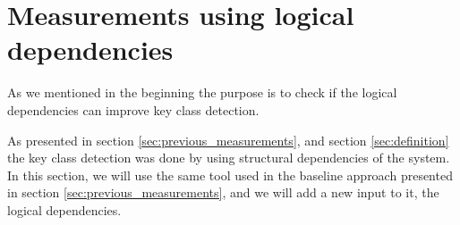 \documentclass[12pt, a4paper, twoside]{report}
\begin{document}
\begin{table}[H]
\renewcommand{\arraystretch}{1}
\caption{Found systems and versions of the systems in GitHub. }
\label{tab:gitfoundsystems}
\centering
{}
\end{table}



\section{Measurements using logical dependencies}
\label{sec:current_measurements}

As we mentioned in the beginning the purpose is to check if the logical dependencies can improve key class detection. 

As presented in section \ref{sec:previous_measurements}, and section \ref{sec:definition} the key class detection was done by using structural dependencies of the system. 
In this section, we will use the same tool used in the baseline approach presented in section \ref{sec:previous_measurements}, and we will add a new input to it, the logical dependencies. 
\end{document}
